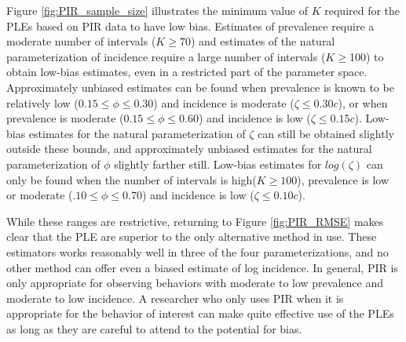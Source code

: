 \documentclass[man, noextraspace, floatsintext]{apa6}\usepackage[]{graphicx}\usepackage[]{color}
\begin{document}
Figure \ref{fig:PIR_sample_size} illustrates the minimum value of $K$ required for the PLEs based on PIR data to have low bias. Estimates of prevalence require a moderate number of intervals ($K \geq 70$) and estimates of the natural parameterization of incidence require a large number of intervals ($K \geq $100) to obtain low-bias estimates, even in a restricted part of the parameter space. Approximately unbiased estimates can be found when prevalence is known to be relatively low ($0.15 \leq \phi \leq 0.30$) and incidence is moderate ($\zeta \leq 0.30c$), or when prevalence is moderate ($0.15 \leq \phi \leq 0.60$) and incidence is low ($\zeta \leq 0.15c$). Low-bias estimates for the natural parameterization of $\zeta$ can still be obtained slightly outside these bounds, and approximately unbiased estimates for the natural parameterization of $\phi$ slightly farther still. Low-bias estimates for $log(\zeta)$ can only be found when the number of intervals is high($K \geq 100$), prevalence is low or moderate ($.10 \leq \phi \leq 0.70$) and incidence is low ($\zeta \leq 0.10c$).

While these ranges are restrictive, returning to Figure \ref{fig:PIR_RMSE} makes clear that the PLE are superior to the only alternative method in use. These estimators works reasonably well in three of the four parameterizations, and no other method can offer even a biased estimate of log incidence. In general, PIR is only appropriate for observing behaviors with moderate to low prevalence and moderate to low incidence. A researcher who only uses PIR when it is appropriate for the behavior of interest can make quite effective use of the PLEs as long as they are careful to attend to the potential for bias.
\end{document}
